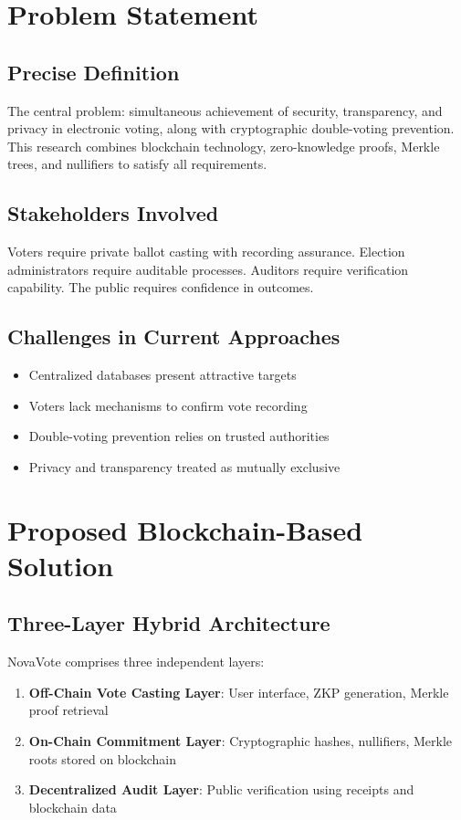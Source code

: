\documentclass[conference]{IEEEtran}
\begin{document}
\section{Problem Statement}

\subsection{Precise Definition}
The central problem: simultaneous achievement of security, transparency, and privacy in electronic voting, along with cryptographic double-voting prevention. This research combines blockchain technology, zero-knowledge proofs, Merkle trees, and nullifiers to satisfy all requirements.

\subsection{Stakeholders Involved}
Voters require private ballot casting with recording assurance. Election administrators require auditable processes. Auditors require verification capability. The public requires confidence in outcomes.

\subsection{Challenges in Current Approaches}
\begin{itemize}
    \item Centralized databases present attractive targets
    \item Voters lack mechanisms to confirm vote recording
    \item Double-voting prevention relies on trusted authorities
    \item Privacy and transparency treated as mutually exclusive
\end{itemize}

\section{Proposed Blockchain-Based Solution}

\subsection{Three-Layer Hybrid Architecture}
NovaVote comprises three independent layers:
\begin{enumerate}
    \item \textbf{Off-Chain Vote Casting Layer}: User interface, ZKP generation, Merkle proof retrieval
    \item \textbf{On-Chain Commitment Layer}: Cryptographic hashes, nullifiers, Merkle roots stored on blockchain
    \item \textbf{Decentralized Audit Layer}: Public verification using receipts and blockchain data
\end{enumerate}
\end{document}

